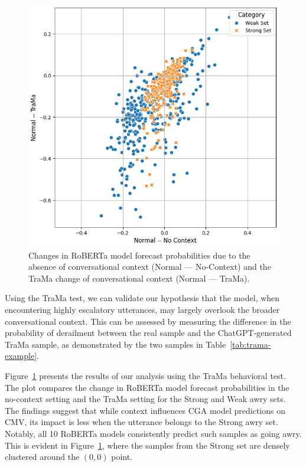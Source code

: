 \begin{figure}[t]
    \centering
    \includegraphics[width=\linewidth]{figures/trama_results.png}
    \caption{
        Changes in RoBERTa model forecast probabilities due to the absence of conversational context (Normal --- No-Context) and the TraMa change of conversational context (Normal --- TraMa).}
    \label{fig:trama-results}
\end{figure}

Using the TraMa test, we can validate our hypothesis that the model, when encountering highly escalatory utterances, may largely overlook the broader conversational context. This can be assessed by measuring the difference in the probability of derailment between the real sample and the ChatGPT-generated TraMa sample, as demonstrated by the two samples in Table~\ref{tab:trama-example}. 

Figure~\ref{fig:trama-results} presents the results of our analysis using the TraMa behavioral test. 
The plot compares the change in RoBERTa model forecast probabilities in the no-context setting and the TraMa setting for the Strong and Weak awry sets.
The findings suggest that while context influences CGA model predictions on CMV, its impact is less when the utterance belongs to the Strong awry set. 
Notably, all 10 RoBERTa models consistently predict such samples as going awry. 
This is evident in Figure~\ref{fig:trama-results}, where the samples from the Strong set are densely clustered around the $(0, 0)$ point. 

